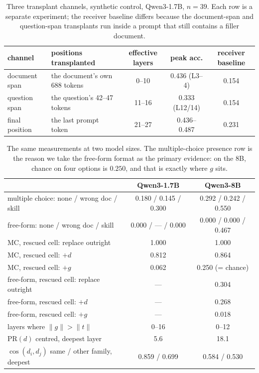 \documentclass{article}
\newcommand{\dvec}{\ensuremath{d}}
\newcommand{\gvec}{\ensuremath{g}}
\newcommand{\tvec}{\ensuremath{t}}
\begin{document}
\begin{table}[t]
\caption{Three transplant channels, synthetic control, Qwen3-1.7B, $n=39$.
Each row is a separate experiment; the receiver baseline differs because the
document-span and question-span transplants run inside a prompt that still
contains a filler document.}
\label{tab:windows}
\centering
\small
\begin{tabular}{llccc}
\toprule
channel & positions transplanted & effective layers & peak acc. & receiver baseline \\
\midrule
document span & the document's own 688 tokens & 0--10 & 0.436 (L3--4) & 0.154 \\
question span & the question's 42--47 tokens  & 11--16 & 0.333 (L12/14) & 0.154 \\
final position & the last prompt token        & 21--27 & 0.436--0.487 & 0.231 \\
\bottomrule
\end{tabular}
\end{table}


\begin{table}[h]
\caption{The same measurements at two model sizes. The multiple-choice presence
row is the reason we take the free-form format as the primary evidence: on the
8B, chance on four options is $0.250$, and that is exactly where $\gvec$ sits.}
\label{tab:ladder}
\centering
\small
\begin{tabular}{lcc}
\toprule
 & Qwen3-1.7B & Qwen3-8B \\
\midrule
multiple choice: none / wrong doc / skill & 0.180 / 0.145 / 0.300 & 0.292 / 0.242 / 0.550 \\
free-form: none / wrong doc / skill       & 0.000 / --- / 0.000   & 0.000 / 0.000 / 0.467 \\
\midrule
MC, rescued cell: replace outright        & 1.000 & 1.000 \\
MC, rescued cell: $+\dvec$                & 0.812 & 0.864 \\
MC, rescued cell: $+\gvec$                & 0.062 & 0.250 (= chance) \\
free-form, rescued cell: replace outright & ---   & 0.304 \\
free-form, rescued cell: $+\dvec$         & ---   & 0.268 \\
free-form, rescued cell: $+\gvec$         & ---   & 0.018 \\
\midrule
layers where $\|\gvec\| > \|\tvec\|$      & 0--16 & 0--12 \\
$\mathrm{PR}(\dvec)$ centred, deepest layer & 5.6 & 18.1 \\
$\cos(\dvec_i,\dvec_j)$ same / other family, deepest & 0.859 / 0.699 & 0.584 / 0.530 \\
\bottomrule
\end{tabular}
\end{table}
\end{document}
